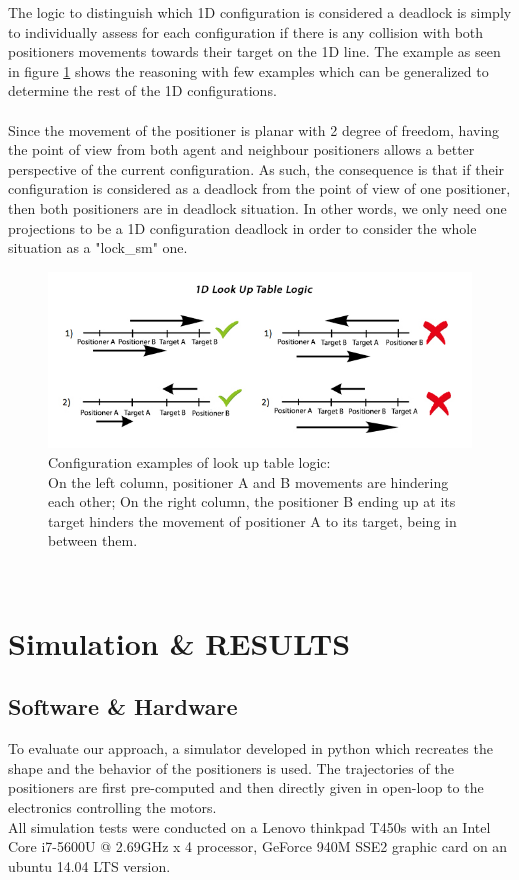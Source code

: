 \documentclass[]{spie}  %
\begin{document}
	The logic to distinguish which 1D configuration is considered a deadlock is simply to individually assess for each configuration if there is any collision with both positioners movements towards their target on the 1D line. The example as seen in figure \ref{look_UpTableLogic} shows the reasoning with few examples which can be generalized to determine the rest of the 1D configurations.\\\\
		Since the movement of the positioner is planar with 2 degree of freedom, having the point of view from both agent and neighbour positioners allows a better perspective of the current configuration. As such, the consequence is that if their configuration is considered as a deadlock from the point of view of one positioner, then both positioners are in deadlock situation. In other words, we only need one projections to be a 1D configuration deadlock in order to consider the whole situation as a "lock\_sm" one. 	
	\begin{figure}[H]
		\centering
		\includegraphics[scale=0.55]{images/1DLookUpTable.jpg}
		\caption{\centering
			 Configuration examples of look up table logic:\\
			On the left column, positioner A and B movements are hindering each other; 
			On the right column,  the positioner B ending up at its target  hinders the movement of positioner A to its target, being in between them. }
		\label{look_UpTableLogic}
	\end{figure}\\ 
	\section{Simulation \& RESULTS}
	\label{RESULTS}
	\subsection{Software \& Hardware}
	\label{Software Hardware}
	To evaluate our approach, a simulator developed in python which recreates the shape and the behavior of the positioners is used. The trajectories of the positioners are first pre-computed and then directly given in open-loop to the electronics controlling the motors.\\  
	All simulation tests were conducted on a Lenovo thinkpad T450s with an Intel Core i7-5600U @ 2.69GHz x 4 processor, GeForce 940M SSE2 graphic card on an ubuntu 14.04 LTS version.
\end{document}
